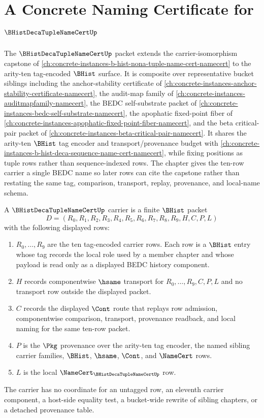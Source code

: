 \chapter{A Concrete Naming Certificate for $\BHistDecaTupleNameCertUp$}
\label{ch:concrete-instances-b-hist-deca-tuple-name-cert-namecert}

The $\BHistDecaTupleNameCertUp$ packet extends the carrier-isomorphism capstone of \autoref{ch:concrete-instances-b-hist-nona-tuple-name-cert-namecert} to the arity-ten tag-encoded $\BHist$ surface. It is composite over representative bucket siblings including the anchor-stability certificate of \autoref{ch:concrete-instances-anchor-stability-certificate-namecert}, the audit-map family of \autoref{ch:concrete-instances-auditmapfamily-namecert}, the BEDC self-substrate packet of \autoref{ch:concrete-instances-bedc-self-substrate-namecert}, the apophatic fixed-point fiber of \autoref{ch:concrete-instances-apophatic-fixed-point-fiber-namecert}, and the beta critical-pair packet of \autoref{ch:concrete-instances-beta-critical-pair-namecert}. It shares the arity-ten $\BHist$ tag encoder and transport/provenance budget with \autoref{ch:concrete-instances-b-hist-deca-sequence-name-cert-namecert}, while fixing positions as tuple rows rather than sequence-indexed rows. The chapter gives the ten-row carrier a single BEDC name so later rows can cite the capstone rather than restating the same tag, comparison, transport, replay, provenance, and local-name schema.

\begin{definition}
\label{def:b-hist-deca-tuple-name-cert-carrier}
A $\BHistDecaTupleNameCertUp$ carrier is a finite $\BHist$ packet
$$
D=(R_0,R_1,R_2,R_3,R_4,R_5,R_6,R_7,R_8,R_9,H,C,P,L)
$$
with the following displayed rows:
\begin{enumerate}
\item $R_0,\ldots,R_9$ are the ten tag-encoded carrier rows. Each row is a $\BHist$ entry whose tag records the local role used by a member chapter and whose payload is read only as a displayed BEDC history component.
\item $H$ records componentwise $\hsame$ transport for $R_0,\ldots,R_9,C,P,L$ and no transport row outside the displayed packet.
\item $C$ records the displayed $\Cont$ route that replays row admission, componentwise comparison, transport, provenance readback, and local naming for the same ten-row packet.
\item $P$ is the $\Pkg$ provenance over the arity-ten tag encoder, the named sibling carrier families, $\BHist$, $\hsame$, $\Cont$, and $\NameCert$ rows.
\item $L$ is the local $\NameCert_{\BHistDecaTupleNameCertUp}$ row.
\end{enumerate}
The carrier has no coordinate for an untagged row, an eleventh carrier component, a host-side equality test, a bucket-wide rewrite of sibling chapters, or a detached provenance table.
\end{definition}

